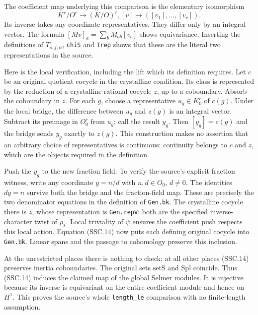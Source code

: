 \documentclass[11pt,a4paper]{article}
\numberwithin{equation}{section}
\theoremstyle{remark}\newtheorem{remark}[theorem]{Remark}
\begin{document}
The coefficient map underlying this comparison is the elementary
isomorphism
\[
 K^r/O^r\longrightarrow(K/O)^r,
       [v]\longmapsto([v_1],\ldots,[v_r]).                    \tag{SSC.14}
\]
Its inverse takes any coordinate representatives. They differ
only by an integral vector. The formula
$[Mv]_a=\sum_b M_{ab}[v_b]$ shows equivariance. Inserting the
definitions of $T_{s,f,\psi}$, \texttt{chi\allowbreak S} and \texttt{Trep}
shows that these are the literal two representations in the source.

Here is the local verification, including the lift which its
definition requires. Let $c$ be an original quotient cocycle in
the crystalline condition. Its class is represented by the
reduction of a crystalline rational cocycle $z$, up to a
coboundary. Absorb the coboundary in $z$. For each $g$, choose a
representative $u_g\in K_0^r$ of $c(g)$. Under the local bridge,
the difference between $u_g$ and $z(g)$ is an integral vector.
Subtract its preimage in $O_0^r$ from $u_g$; call the result $y_g$.
Then $[y_g]=c(g)$ and the bridge sends $y_g$ exactly to $z(g)$.
This construction makes no assertion that an arbitrary choice
of representatives is continuous: continuity belongs to $c$ and
$z$, which are the objects required in the definition.

Push the $y_g$ to the new fraction field. To verify the source's
explicit fraction witness, write any coordinate $y=n/d$ with
$n,d\in O_0$, $d\ne0$. The identities
$dy=n$ survive both the bridge and the fraction-field map. These
are precisely the two denominator equations in the definition of
\texttt{Gen.\allowbreak bk}. The crystalline cocycle there is $z$, whose
representation is \texttt{Gen.\allowbreak rep\allowbreak V}: both are the specified
inverse-character twist of $\rho_s$. Local triviality of $\psi$
ensures the coefficient push respects this local action.
Equation (SSC.14) now puts each defining original cocycle into
\texttt{Gen.\allowbreak bk}. Linear spans and the passage to cohomology preserve
this inclusion.

At the unrestricted places there is nothing to check; at all other
places (SSC.14) preserves inertia coboundaries. The original sets
$\mathrm{setS}$ and $\mathrm{Spl}$ coincide. Thus (SSC.14) induces
the claimed map of the global Selmer modules. It is injective
because its inverse is equivariant on the entire coefficient module
and hence on $H^1$. This proves the source's whole
\texttt{length\_\allowbreak le} comparison with no finite-length assumption.
\end{document}
